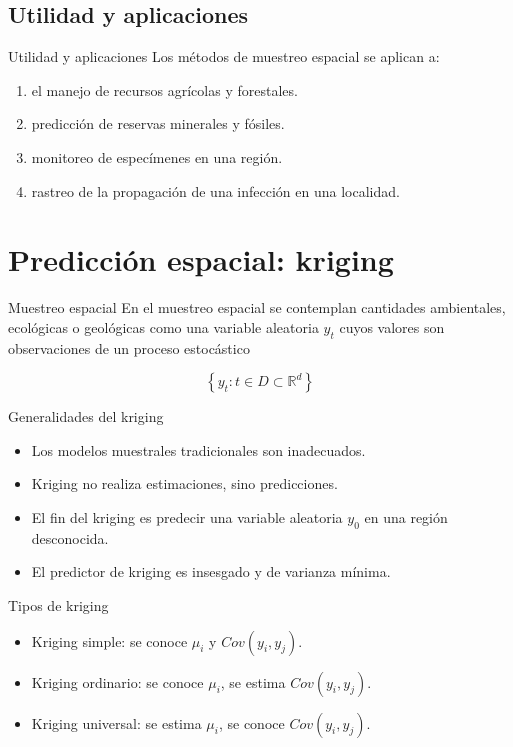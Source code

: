 \documentclass[12pts]{beamer}
\begin{document}
	\subsection{Utilidad y aplicaciones}
	\begin{frame}{Utilidad y aplicaciones}
		Los métodos de muestreo espacial se aplican a:
		\begin{enumerate}
			\item el manejo de recursos agrícolas y forestales.
			\item predicción de reservas minerales y fósiles.
			\item monitoreo de especímenes en una región.
			\item rastreo de la propagación de una infección en una localidad. 
		\end{enumerate}
	\end{frame}

	\section{Predicción espacial: kriging}
	\begin{frame}{Muestreo espacial}
		En el muestreo espacial se contemplan cantidades ambientales, ecológicas o geológicas como una variable aleatoria  $y_t$ cuyos valores son observaciones de un proceso estocástico
		
		\begin{equation}
		\left\lbrace y_t : t \in D \subset \mathbb{R}^d \right\rbrace\label{proceso}
		\end{equation}
		
	\end{frame}
	
	\begin{frame}{Generalidades del kriging}
		\begin{itemize}
			\item Los modelos muestrales tradicionales son inadecuados.
			\item Kriging no realiza estimaciones, sino predicciones. 
			\item El fin del kriging es predecir una variable aleatoria $y_0$ en una región desconocida.
			\item El predictor de kriging es insesgado y de varianza mínima.
		\end{itemize}
	\end{frame}

	\begin{frame}{Tipos de kriging}
		\begin{itemize}
			\item Kriging simple: se conoce $\mu_i$ y $Cov(y_i, y_j)$.
			\item Kriging ordinario: se conoce $\mu_i$, se estima $Cov(y_i, y_j)$. 
			\item Kriging universal: se estima $\mu_i$, se conoce $Cov(y_i, y_j)$.
		\end{itemize}
	\end{frame}
\end{document}

